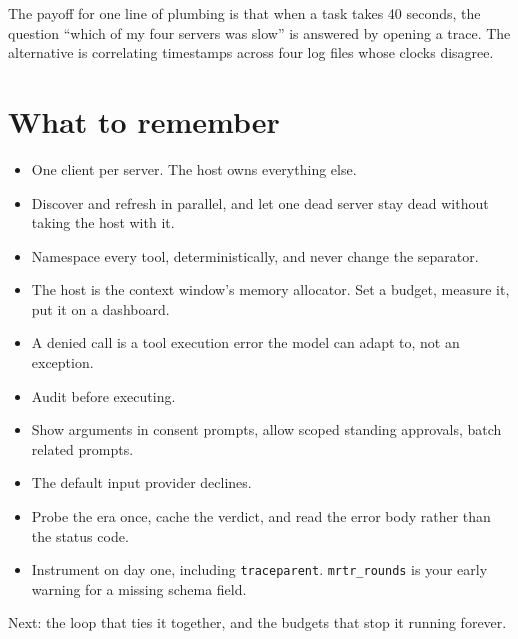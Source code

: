 The payoff for one line of plumbing is that when a task takes 40 seconds, the question ``which of my four servers was slow'' is answered by opening a
trace. The alternative is correlating timestamps across four log files whose
clocks disagree.

\section{What to remember}

\begin{itemize}[leftmargin=1.6em, itemsep=3pt]
\item One client per server. The host owns everything else.
\item Discover and refresh in parallel, and let one dead server stay dead
without taking the host with it.
\item Namespace every tool, deterministically, and never change the separator.
\item The host is the context window's memory allocator. Set a budget, measure
it, put it on a dashboard.
\item A denied call is a tool execution error the model can adapt to, not an
exception.
\item Audit before executing.
\item Show arguments in consent prompts, allow scoped standing approvals, batch
related prompts.
\item The default input provider declines.
\item Probe the era once, cache the verdict, and read the error body rather than
the status code.
\item Instrument on day one, including \texttt{traceparent}. \texttt{mrtr\_rounds}
is your early warning for a missing schema field.
\end{itemize}

Next: the loop that ties it together, and the budgets that stop it running
forever.
